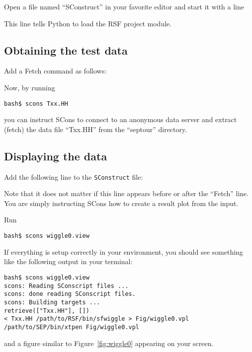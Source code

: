 Open a file named ``SConstruct'' in your favorite editor and start it with a
line 



This line tells Python to load the RSF project module.

\subsection{Obtaining the test data}

Add a Fetch command as follows:



Now, by running 
\begin{verbatim}
bash$ scons Txx.HH
\end{verbatim}
you can instruct SCons to connect to an anonymous data server and extract
(fetch) the data file ``Txx.HH'' from the ``septour'' directory.

\subsection{Displaying the data}


Add the following line to the \texttt{SConstruct} file:



Note that it does not matter if this line appears before or after the
``Fetch'' line. You are simply instructing SCons how to create a
result plot from the input.

Run
\begin{verbatim}
bash$ scons wiggle0.view
\end{verbatim}
If everything is setup correctly in your environment, you should see 
something like the following output in your terminal:
\begin{verbatim}
bash$ scons wiggle0.view
scons: Reading SConscript files ...
scons: done reading SConscript files.
scons: Building targets ...
retrieve(["Txx.HH"], [])
< Txx.HH /path/to/RSF/bin/sfwiggle > Fig/wiggle0.vpl
/path/to/SEP/bin/xtpen Fig/wiggle0.vpl
\end{verbatim}
and a figure similar to Figure~\ref{fig:wiggle0} appearing on your screen.


